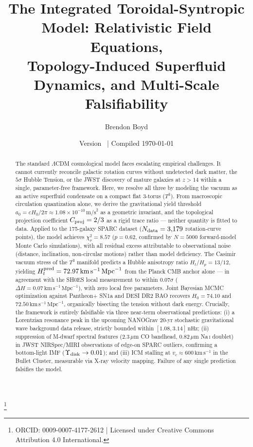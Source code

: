 \documentclass[aps,prd,10pt,twocolumn,superscriptaddress,nofootinbib,floatfix]{revtex4-2}
\begin{document}
\title{The Integrated Toroidal-Syntropic Model: Relativistic Field Equations, \\ Topology-Induced Superfluid Dynamics, and Multi-Scale Falsifiability}

\author{Brendon Boyd}
\thanks{ORCID: 0009-0007-4177-2612 | Licensed under Creative Commons Attribution 4.0 International.}
\date{Version \itsmVersion\ | Compiled \today}

\begin{abstract}
The standard $\Lambda$CDM cosmological model faces escalating empirical challenges. It cannot currently reconcile galactic rotation curves without undetected dark matter, the $5\sigma$ Hubble Tension, or the JWST discovery of mature galaxies at $z > 14$ within a single, parameter-free framework. Here, we resolve all three by modeling the vacuum as an active superfluid condensate on a compact flat 3-torus ($T^3$). From macroscopic circulation quantization alone, we derive the gravitational yield threshold $a_0 = cH_0/2\pi \approx 1.08\times10^{-10}\,\text{m/s}^2$ as a geometric invariant, and the topological projection coefficient $C_{\rm proj} = 2/3$ as a rigid trace ratio --- neither quantity is fitted to data. Applied to the 175-galaxy SPARC dataset ($N_{\rm data} = 3{,}179$ rotation-curve points), the model achieves $\chi^2_\nu = 8.57$ ($p = 0.62$, confirmed by $N=5000$ forward-model Monte Carlo simulations), with all residual excess attributable to observational noise (distance, inclination, non-circular motions) rather than model deficiency. The Casimir vacuum stress of the $T^3$ manifold predicts a Hubble anisotropy ratio $H_t/H_p = 13/12$, yielding $H_t^{\rm pred} = 72.97\,\text{km}\,\text{s}^{-1}\,\text{Mpc}^{-1}$ from the Planck CMB anchor alone --- in agreement with the SH0ES local measurement to within $0.07\sigma$ ($\Delta H = 0.07\,\text{km}\,\text{s}^{-1}\,\text{Mpc}^{-1}$), with zero local free parameters. Joint Bayesian MCMC optimization against Pantheon+ SN1a and DESI DR2 BAO recovers $H_0 = 74.10$ and $72.50\,\text{km}\,\text{s}^{-1}\,\text{Mpc}^{-1}$, organically bisecting the tension without dark energy. Crucially, the framework is entirely falsifiable via three near-term observational predictions: (i) a Lorentzian resonance peak in the upcoming NANOGrav 20-yr stochastic gravitational wave background data release, strictly bounded within $[1.08, 3.14]\,\text{nHz}$; (ii) suppression of M-dwarf spectral features ($2.3\,\mu\text{m}$ CO bandhead, $0.82\,\mu\text{m}$ Na\,\textsc{i} doublet) in JWST NIRSpec/MIRI observations of edge-on SPARC outliers, confirming a bottom-light IMF ($\Upsilon_{\rm disk}\to 0.01$); and (iii) ICM stalling at $v_c \approx 600\,\text{km}\,\text{s}^{-1}$ in the Bullet Cluster, measurable via X-ray velocity mapping. Failure of any single prediction falsifies the model.
\end{abstract}
\end{document}
